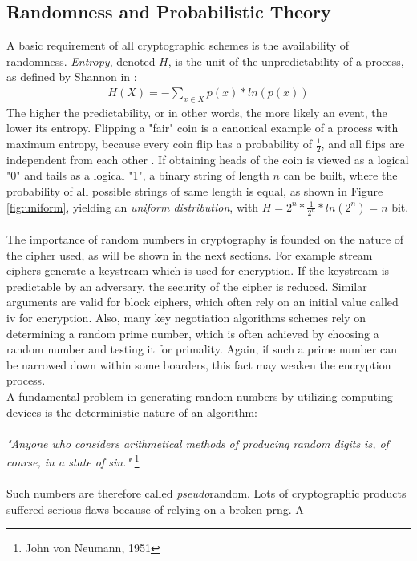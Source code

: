 \subsection{Randomness and Probabilistic Theory}
A basic requirement of all cryptographic schemes is the availability of randomness. \textit{Entropy}, denoted $H$, is the unit of the unpredictability of a process, as
 defined by Shannon in \cite{6773024}:
 \begin{align}
 H(X) = - \sum_{x \in X}^{} p(x) * ln(p(x))
\end{align}
The higher the predictability, or in other words, the more likely an event, the lower its entropy. Flipping a "fair" coin is a canonical 
example of a process with maximum entropy, because every coin flip has a probability of $\frac{1}{2}$, and all flips are independent from each other \cite{1621063}.
If obtaining heads of the coin is viewed as a logical "0" and tails as a logical "1", a binary string of length $n$ can be built, where the probability of all possible
strings of same length is equal, as shown in Figure \ref{fig:uniform}, yielding an \textit{uniform distribution}, with
$H = 2^n*\frac{1}{2^n}*ln(2^n) = n$ bit. 
\\
\\
The importance of random numbers in cryptography is founded on the nature of the cipher used, as will be shown in the next sections. For example
stream ciphers generate a keystream which is used
for encryption. If the keystream is predictable by an adversary, the security of the cipher is reduced. Similar arguments are valid for block ciphers, which often
rely on an initial value called \gls{iv} for encryption. Also, many key negotiation algorithms schemes rely on determining a random prime number, which is often 
achieved by choosing a random number and testing it for primality. Again, if such a prime number can be narrowed down within some boarders, this fact may
weaken the encryption process.
\\
A fundamental problem in generating random numbers by utilizing computing devices is the deterministic nature of an algorithm:
\\
\\
\textit{"Anyone who considers arithmetical methods of producing random digits is, of course, in a state of sin."} \footnote{John von Neumann, 1951}
\\
\\
Such numbers are therefore called \textit{pseudo}random. Lots of cryptographic products suffered serious flaws because of relying on a broken \gls{prng}. A 
